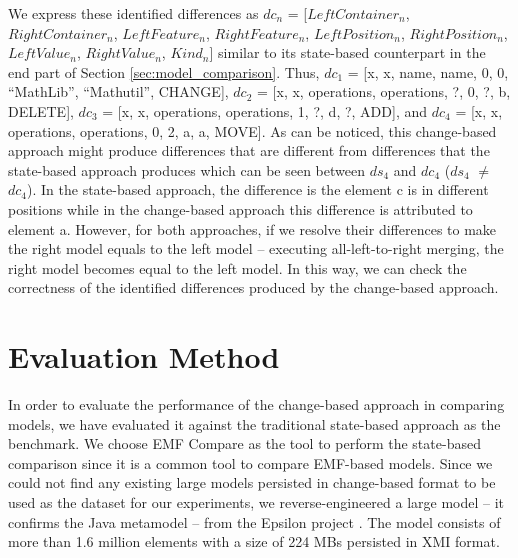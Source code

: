 \documentclass{jot}
\begin{document}
We express these identified differences as $dc_{n}$ = [$LeftContainer_n$, $RightContainer_n$, $LeftFeature_n$, $RightFeature_n$, $LeftPosition_n$, $RightPosition_n$, $LeftValue_n$, $RightValue_n$, $Kind_n$] similar to its state-based counterpart in the end part of Section \ref{sec:model_comparison}. Thus, $dc_{1}$ =  [\textsf{x}, \textsf{x}, \textsf{name}, \textsf{name}, 0, 0, ``MathLib'', ``Mathutil'', \textsf{CHANGE}], $dc_{2}$ = [\textsf{x}, \textsf{x}, \textsf{operations}, \textsf{operations}, ?, 0, ?, \textsf{b}, \textsf{DELETE}], $dc_{3}$ = [\textsf{x}, \textsf{x}, \textsf{operations}, \textsf{operations}, 1, ?, \textsf{d}, ?, \textsf{ADD}], and $dc_{4}$ = [\textsf{x}, \textsf{x}, \textsf{operations}, \textsf{operations}, 0, 2, \textsf{a}, \textsf{a}, \textsf{MOVE}]. As can be noticed, this change-based approach might produce differences that are different from differences that the state-based approach produces which can be seen between  $ds_{4}$ and $dc_{4}$ ($ds_{4}$ $\neq$ $dc_{4}$). In the state-based approach, the difference is the element \textsf{c} is in different positions while in the change-based approach this difference is attributed to element \textsf{a}. However, for both approaches, if we resolve their differences to make the right model equals to the left model -- executing all-left-to-right merging, the right model becomes equal to the left model. In this way, we can check the correctness of the identified differences produced by the change-based approach.

\section{Evaluation Method}
\label{sec:evaluation}

In order to evaluate the performance of the change-based approach in comparing models, we have evaluated it against the traditional state-based approach as the benchmark. We choose EMF Compare \cite{emfcompare2018developer,eclipse2017compare} as the tool to perform the state-based comparison since it is a common tool to compare EMF-based models. Since we could not find any existing large models persisted in change-based format to be used as the dataset for our experiments, we reverse-engineered a large model -- it confirms the Java metamodel \cite{eclipse2018modiscojava} -- from the Epsilon project \cite{eclipse2018epsilongit,eclipse2017epsilon}. The model consists of more than 1.6 million elements with a size of 224 MBs persisted in XMI format. 
\end{document}

